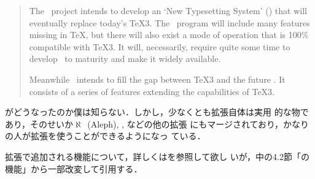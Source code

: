 \documentclass[a4paper,11pt]{jsarticle}
\begin{document}
\begin{quotation}
The \NTS\ project intends to develop an `New Typesetting System' (\NTS)
that will eventually replace today's \TeX3.  The \NTS\ program will
include many features missing in \TeX, but there will also exist a mode
of operation that is 100\% compatible with \TeX3.  It will, necessarily,
require quite some time to develop \NTS\ to maturity and make it widely
available.

Meanwhile \eTeX\ intends to fill the gap between \TeX3 and the future
\NTS. It consists of a series of features extending the capabilities of
\TeX3.
\end{quotation}

\NTS がどうなったのか僕は知らない．しかし，少なくとも\eTeX 拡張自体は実用
的な物であり，そのせいか$\aleph$~(Aleph), \pdfTeX, \XeTeX などの他の拡張
にもマージされており，かなりの人が\eTeX 拡張を使うことができるようになっ
ている．

\eTeX 拡張で追加される機能について，詳しくは\cite{etexman}を参照して欲し
いが，\cite{h7k}中の4.2節「\eTeX の機能」から一部改変して引用する．
\end{document}
